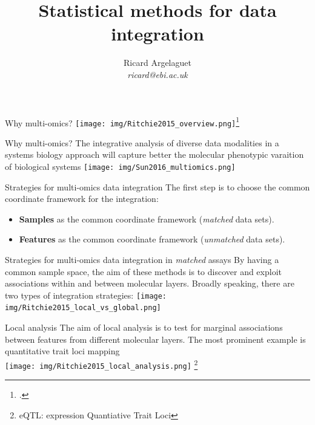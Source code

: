 \documentclass[aspectratio=169,notes]{beamer}
\title{Statistical methods for data integration}
\author{Ricard Argelaguet \\ \textit{ricard@ebi.ac.uk}}
\institute{European Bioinformatics Institute (EMBL-EBI) \\ University of Cambridge}
\newcommand\blfootnote[1]{%
  \begingroup
  \renewcommand\thefootnote{}\footnote{#1}%
  \addtocounter{footnote}{-1}%
  \endgroup
}
\begin{document}
	\begin{frame}
	\titlepage
	\end{frame}
	

	\begin{frame}{Why multi-omics?}
	\centering
	\texttt{[image: img/Ritchie2015\_overview.png]}\footcite{Ritchie2015}
	\end{frame}
	
	\begin{frame}{Why multi-omics?}
	The integrative analysis of diverse data modalities in a systems biology approach will capture better the molecular phenotypic varaition of biological systems
	\centering
	\texttt{[image: img/Sun2016\_multiomics.png]}
	\end{frame}

	\begin{frame}{Strategies for multi-omics data integration}
	The first step is to choose the common coordinate framework for the integration:
	\begin{itemize}
		\item \textbf{Samples} as the common coordinate framework (\textit{matched} data sets).
		\item \textbf{Features} as the common coordinate framework (\textit{unmatched} data sets).
	\end{itemize}	
	\end{frame}

	\begin{frame}{Strategies for multi-omics data integration in \textit{matched} assays}
	By having a common sample space, the aim of these methods is to discover and exploit associations within and between molecular layers. Broadly speaking, there are two types of integration strategies:
	\centering
	\texttt{[image: img/Ritchie2015\_local\_vs\_global.png]}
	\end{frame}

	\begin{frame}{Local analysis}
	The aim of local analysis is to test for marginal associations between features from different molecular layers. The most prominent example is quantitative trait loci mapping\\
	\leavevmode\newline
	\centering
	\texttt{[image: img/Ritchie2015\_local\_analysis.png]}
	\blfootnote{eQTL: expression Quantiative Trait Loci}
	\end{frame}
\end{document}
